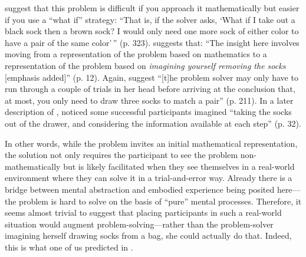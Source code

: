 \textcite{Bowden2005} suggest that this problem is difficult if you approach it mathematically but easier if you use a ``what if'' strategy: ``That is, if the solver asks, `What if I take out a black sock then a brown sock? I would only need one more sock of either color to have a pair of the same color'\,'' (p. 323). \textcite{Jones2003} suggests that: ``The insight here involves moving from a representation of the problem based on mathematics to a representation of the problem based on \emph{imagining yourself removing the socks} {[}emphasis added{]}'' (p.
12). Again, \textcite{Chu2011} suggest ``{[}t{]}he problem solver may only have to run through a couple of trials in her head before arriving at the conclusion that, at most, you only need to draw three socks to match a pair'' (p. 211). In a later description of \textcite{Fleck2013}, \textcite{Weisberg2015} noticed some successful participants imagined ``taking the socks out of the drawer, and considering the information available at each step'' (p. 32).

In other words, while the problem invites an initial mathematical representation, the solution not only requires the participant to see the problem non-mathematically but is likely facilitated when they see themselves in a real-world environment where they can solve it in a trial-and-error way. Already there is a bridge between mental abstraction and embodied experience being posited here---the problem is hard to solve on the basis of ``pure'' mental processes. Therefore, it seems almost trivial to suggest that placing participants in such a real-world situation would augment problem-solving---rather than the problem-solver imagining herself drawing socks from a bag, she could actually do that. Indeed, this is what one of us predicted in \textcite{Vallée-Tourangeau2020}.


